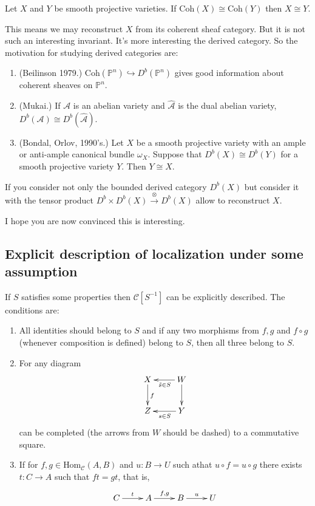 \begin{theorem}[Gabriel]
\label{theorem-Gabriel}
Let $X$ and $Y$ be smooth projective varieties. If $\text{Coh}(X)\cong
\text{Coh}(Y)$ then $X\cong Y$.
\end{theorem}

This means we may reconstruct $X$ from its coherent sheaf category. But it is
not such an interesting invariant. It's more interesting the derived category.
So the motivation for studying derived categories are:

\begin{enumerate}
\item (Beilinson 1979.) $\text{Coh}(\mathbb{P}^n)\hookrightarrow
D^b(\mathbb{P}^n)$ gives good information about coherent sheaves on
$\mathbb{P}^n$.
\item (Mukai.) If $\mathcal{A}$ is an abelian variety and $\hat{\mathcal{A}}$ is
the dual abelian variety, $D^b(\mathcal{A})\cong D^b(\hat{\mathcal{A}})$.
\item (Bondal, Orlov, 1990's.) Let $X$ be a smooth projective variety with an
ample or anti-ample canonical bundle $\omega_X$. Suppose that $D^b(X)\cong
D^b(Y)$ for a smooth projective variety $Y$. Then $Y \cong X$.
\end{enumerate}

\begin{remark}
\label{remark-derived-category-with-tensor-product}
If you consider not only the bounded derived category $D^b(X)$ but consider it
with the tensor product $D^b \times D^b(X) \xrightarrow{\otimes} D^b(X)$ allow
to reconstruct $X$.
\end{remark}

I hope you are now convinced this is interesting.

\subsection*{Explicit description of localization under some assumption}
\label{subsection-explicit-description-of-localization}

If $S$ satisfies some properties then $\mathcal{C}[S^{-1}]$ can be explicitly
described. The conditions are:

\begin{enumerate}
\item All identities should belong to $S$ and if any two morphisms from $f,g$
and $f \circ g$ (whenever composition is defined) belong to $S$, then all three
belong to $S$.
\item For any diagram 
$$
\xymatrix{
X\ar[d]^{f}&W\ar[l]^{\tilde{s}\in S}\ar[d]\\
Z&\ar[l]^{s\in S}Y
}
$$
can be completed (the arrows from $W$ should be dashed) to a commutative square.
\item If for $f,g\in \text{Hom}_{\mathcal{C}}(A,B)$ and $u:B \to U$ such athat
$u\circ f=u\circ g$ there exists
$t:C \to A$ such that $ft=gt$, that is,
$$
\xymatrix{
C\ar[r]^{t}&A\ar[r]^{f,g}&B\ar[r]^{u}&U
}
$$
\end{enumerate}

